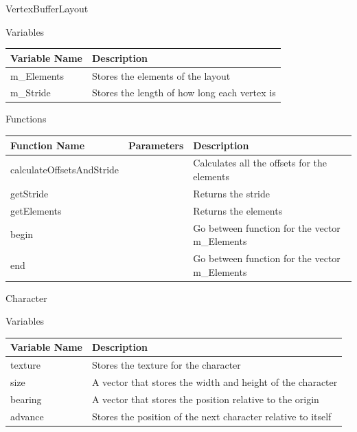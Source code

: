 \documentclass[../../Main.tex]{subfiles}
\begin{document}
    VertexBufferLayout
    \begin{center}
        Variables
        \begin{tabular}{ | m{} | m{} | }
            \hline
            \textbf{Variable Name} & \textbf{Description} \\
            \hline
            m\_Elements & Stores the elements of the layout \\
            \hline
            m\_Stride & Stores the length of how long each vertex is \\
            \hline
        \end{tabular}
        Functions
        \begin{tabular}{ | m{} | m{}| m{} | }
            \hline
            \textbf{Function Name} & \textbf{Parameters} & \textbf{Description} \\
            \hline
            calculateOffsetsAndStride & & Calculates all the offsets for the elements \\
            \hline
            getStride & & Returns the stride \\
            \hline
            getElements & & Returns the elements \\
            \hline
            begin & & Go between function for the vector m\_Elements \\
            \hline
            end & & Go between function for the vector m\_Elements \\
            \hline
        \end{tabular}
    \end{center}
    Character
    \begin{center}
        Variables
        \begin{tabular}{ | m{} | m{} | }
            \hline
            \textbf{Variable Name} & \textbf{Description} \\
            \hline
            texture & Stores the texture for the character \\
            \hline
            size & A vector that stores the width and height of the character \\
            \hline
            bearing & A vector that stores the position relative to the origin \\
            \hline
            advance & Stores the position of the next character relative to itself\\
            \hline
        \end{tabular}
    \end{center}
\end{document}

